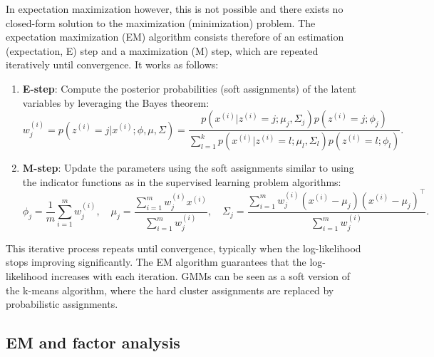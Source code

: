 \documentclass[a4paper,11pt]{article}
\numberwithin{equation}{section}
\begin{document}
{	In expectation maximization however, this is not possible and there exists no closed-form solution to the maximization (minimization) problem. The expectation maximization (EM) algorithm consists therefore of an estimation (expectation, E) step and a maximization (M) step, which are repeated iteratively until convergence. It works as follows: 
	\begin{enumerate}
		\item \textbf{E-step}: Compute the posterior probabilities (soft assignments) of the latent variables by leveraging the Bayes theorem:  
		\[
		w^{(i)}_j = p(z^{(i)} = j | x^{(i)}; \phi, \mu, \Sigma) = \frac{p(x^{(i)} | z^{(i)} = j; \mu_j, \Sigma_j)p(z^{(i)} = j; \phi_j)}{\sum_{l=1}^k p(x^{(i)} | z^{(i)} = l; \mu_l, \Sigma_l)p(z^{(i)} = l; \phi_l)}.
		\] 
		\item \textbf{M-step}: Update the parameters using the soft assignments similar to using the indicator functions as in the supervised learning problem algorithms:  
		\[
		\phi_j = \frac{1}{m} \sum_{i=1}^m w^{(i)}_j, \quad \mu_j = \frac{\sum_{i=1}^m w^{(i)}_j x^{(i)}}{\sum_{i=1}^m w^{(i)}_j}, \quad \Sigma_j = \frac{\sum_{i=1}^m w^{(i)}_j (x^{(i)} - \mu_j)(x^{(i)} - \mu_j)^\top}{\sum_{i=1}^m w^{(i)}_j}.
		\]  
	\end{enumerate}
	
	This iterative process repeats until convergence, typically when the log-likelihood stops improving significantly. The EM algorithm guarantees that the log-likelihood increases with each iteration. GMMs can be seen as a soft version of the k-means algorithm, where the hard cluster assignments are replaced by probabilistic assignments.
}

\subsection{EM and factor analysis} %
\end{document}
